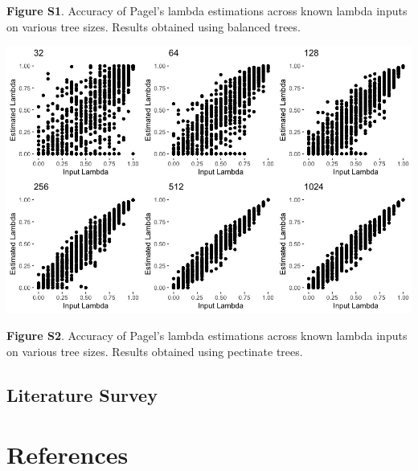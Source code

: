 \documentclass[
]{article}
\begin{document}
\textbf{Figure S1}. Accuracy of Pagel's lambda estimations across known
lambda inputs on various tree sizes. Results obtained using balanced
trees. \hfill\break

\includegraphics[width=0.75\linewidth]{Fig1}

\textbf{Figure S2}. Accuracy of Pagel's lambda estimations across known
lambda inputs on various tree sizes. Results obtained using pectinate
trees. \hfill\break

\hypertarget{literature-survey}{%
\subsection{Literature Survey}\label{literature-survey}}

\newpage

\hypertarget{references}{%
\section{References}\label{references}}

\setlength{\parindent}{-0.25in} \setlength{\leftskip}{0.25in}
\setlength{\parskip}{8pt} \noindent

\hypertarget{refs}{}
\end{document}
